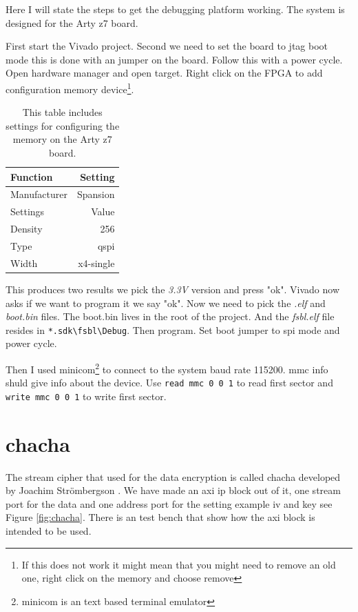 \documentclass[]{article}
\begin{document}
Here I will state the steps to get the debugging platform working.
The system is designed for the Arty z7 board.

First start the Vivado project.
Second we need to set the board to jtag boot mode this is done with an jumper on the board.
Follow this with a power cycle.
Open hardware manager and open target.
Right click on the FPGA to add configuration memory device\footnote{If this does not work it might mean that you might need to remove an old one, right click on the memory and choose remove}.
\begin{table}
	\centering
	\begin{tabular}{l|r}
		Function		& Setting		\\
		\hline
		Manufacturer	& Spansion  	\\
		Settings 		& Value  		\\
		Density  		& 256  			\\
		Type 			& qspi  		\\
		Width 			& x4-single
	\end{tabular}
	\caption{This table includes settings for configuring the memory on the Arty z7 board.}
	\label{table:memorySettings}
\end{table}

This produces two results we pick the \emph{3.3V} version and press "ok".
Vivado now asks if we want to program it we say "ok".
Now we need to pick the \emph{.elf} and \emph{boot.bin} files.
The boot.bin lives in the root of the project.
And the \emph{fsbl.elf} file resides in \texttt{*.sdk\textbackslash fsbl\textbackslash Debug}.
Then program.
Set boot jumper to spi mode and power cycle.

Then I used minicom\footnote{minicom is an text based terminal emulator} to connect to the system baud rate 115200.
mmc info shuld give info about the device.
Use \texttt{read mmc 0 0 1} to read first sector and \texttt{write mmc 0 0 1} to write first sector.


\section{chacha}
The stream cipher that used for the data encryption is called chacha \cite{chacha} developed by Joachim Strömbergson \cite{joachim}.
We have made an axi ip block out of it, one stream port for the data and one address port for the setting example iv and key see Figure \ref{fig:chacha}.
There is an test bench that show how the axi block is intended to be used.
\end{document}
